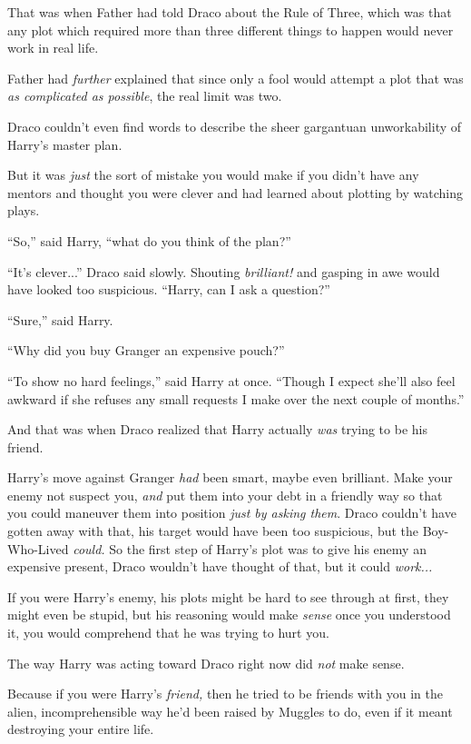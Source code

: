 That was when Father had told Draco about the Rule of Three, which was that any plot which required more than three different things to happen would never work in real life.

Father had \emph{further} explained that since only a fool would attempt a plot that was \emph{as complicated as possible}, the real limit was two.

Draco couldn't even find words to describe the sheer gargantuan unworkability of Harry's master plan.

But it was \emph{just} the sort of mistake you would make if you didn't have any mentors and thought you were clever and had learned about plotting by watching plays.

``So,'' said Harry, ``what do you think of the plan?''

``It's clever...'' Draco said slowly. Shouting \emph{brilliant!} and gasping in awe would have looked too suspicious. ``Harry, can I ask a question?''

``Sure,'' said Harry.

``Why did you buy Granger an expensive pouch?''

``To show no hard feelings,'' said Harry at once. ``Though I expect she'll also feel awkward if she refuses any small requests I make over the next couple of months.''

And that was when Draco realized that Harry actually \emph{was} trying to be his friend.

Harry's move against Granger \emph{had} been smart, maybe even brilliant. Make your enemy not suspect you, \emph{and} put them into your debt in a friendly way so that you could maneuver them into position \emph{just by asking them}. Draco couldn't have gotten away with that, his target would have been too suspicious, but the Boy-Who-Lived \emph{could.} So the first step of Harry's plot was to give his enemy an expensive present, Draco wouldn't have thought of that, but it could \emph{work...}

If you were Harry's enemy, his plots might be hard to see through at first, they might even be stupid, but his reasoning would make \emph{sense} once you understood it, you would comprehend that he was trying to hurt you.

The way Harry was acting toward Draco right now did \emph{not} make sense.

Because if you were Harry's \emph{friend,} then he tried to be friends with you in the alien, incomprehensible way he'd been raised by Muggles to do, even if it meant destroying your entire life.

